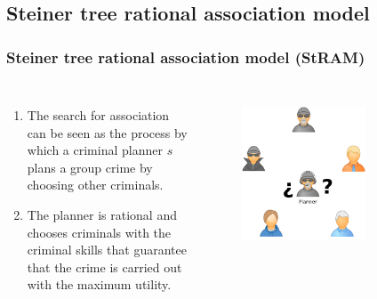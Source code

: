 \documentclass[aspectratio=169]{beamer}
\begin{document}
\subsection[StRAM]{Steiner tree rational association model}

\begin{frame}
\frametitle{Steiner tree rational association model (StRAM)}
  \begin{columns}
    \begin{enumerate}
      \item<1-> The search for association can be seen as the process by which a criminal planner $s$ plans a group crime by choosing other criminals.
      \item<2-> The planner is rational and chooses criminals with the criminal skills that guarantee that the crime is carried out with the maximum utility.
    \end{enumerate}
    \begin{figure}[ht]
      \centering
       {\includegraphics[width=0.7\textwidth]{images/planner-1.pdf}}%
    \end{figure}
  \end{columns}
\end{frame}
\end{document}
